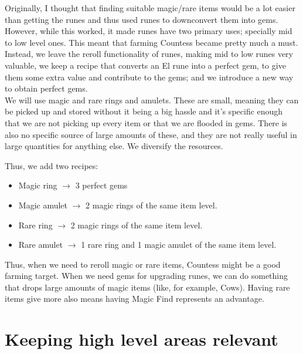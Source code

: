 \documentclass[12pt,a4paper]{article}
\begin{document}
Originally, I thought that finding suitable magic/rare items would be a lot easier than getting the runes and thus used runes to downconvert them into gems. However, while this worked, it made runes have two primary uses; specially mid to low level ones. This meant that farming Countess became pretty much a must.\\

Instead, we leave the reroll functionality of runes, making mid to low runes very valuable, we keep a recipe that converts an El rune into a perfect gem, to give them some extra value and contribute to the gems; and we introduce a new way to obtain perfect gems.\\

We will use magic and rare rings and amulets. These are small, meaning they can be picked up and stored without it being a big hassle and it's specific enough that we are not picking up every item or that we are flooded in gems. There is also no specific source of large amounts of these, and they are not really useful in large quantities for anything else. We diversify the resources.

Thus, we add two recipes:

\begin{itemize}

\item Magic ring $\rightarrow$ 3 perfect gems
\item Magic amulet $\rightarrow$ 2 magic rings of the same item level.
\item Rare ring $\rightarrow$ 2 magic rings of the same item level.
\item Rare amulet $\rightarrow$ 1 rare ring and 1 magic amulet of the same item level.

\end{itemize}

Thus, when we need to reroll magic or rare items, Countess might be a good farming target. When we need gems for upgrading runes, we can do something that drops large amounts of magic items (like, for example, Cows). Having rare items give more also means having Magic Find represents an advantage.\\

\section{Keeping high level areas relevant}
\end{document}
